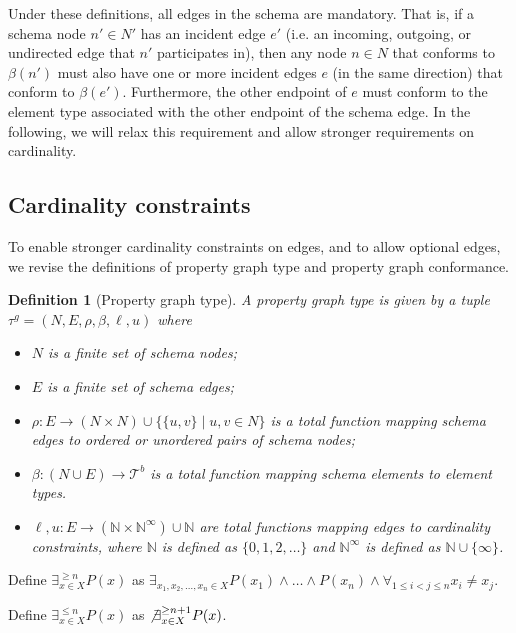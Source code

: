 \documentclass[a4paper]{article}
\newtheorem{definition}[theorem]{Definition}
\newcommand{\N}{\mathbb{N}}
\newcommand{\btypes}{\mathcal{T}^b}
\newcommand{\gtype}{\tau^g}
\begin{document}
Under these definitions, all edges in the schema are mandatory. That is, if a schema node $n' \in N'$ has an incident edge $e'$ (i.e. an incoming, outgoing, or undirected edge that $n'$ participates in), then any node $n \in N$ that conforms to $\beta(n')$ must also have one or more incident edges $e$ (in the same direction) that conform to $\beta(e')$. Furthermore, the other endpoint of $e$ must conform to the element type associated with the other endpoint of the schema edge. In the following, we will relax this requirement and allow stronger requirements on cardinality.

\subsection{Cardinality constraints}

To enable stronger cardinality constraints on edges, and to allow optional edges, we revise the definitions of property graph type and property graph conformance.

\begin{definition}[Property graph type]
  A \emph{property graph type} is given by a tuple $\gtype = (N, E, \rho, \beta, \ell, u)$ where 
  \begin{itemize}
    \item $N$ is a finite set of schema nodes;
    \item $E$ is a finite set of schema edges;
    \item $\rho : E \to (N \times N) \cup \{\{u, v\} \mid u, v \in N\}$ is a total function mapping schema edges to ordered or unordered pairs of schema nodes;
    \item $\beta : (N \cup E) \to \btypes$ is a total function mapping schema elements to element types.
    \item $\ell, u : E \to (\N \times \N^\infty) \cup \N$ are total functions mapping edges to cardinality constraints, where $\N$ is defined as $\{0, 1, 2, \ldots\}$ and $\N^\infty$ is defined as $\N \cup \{\infty\}$.
  \end{itemize}
\end{definition}

Define $\exists^{\geq n}_{x \in X} P(x)$ as $\exists_{x_1, x_2, \ldots, x_n \in X} P(x_1) \wedge \ldots \wedge P(x_n) \wedge \forall_{1 \leq i < j \leq n} x_i \neq x_j$.

Define $\exists^{\leq n}_{x \in X} P(x)$ as $\not \exists^{\geq n+1}_{x \in X} P(x)$.
\end{document}
